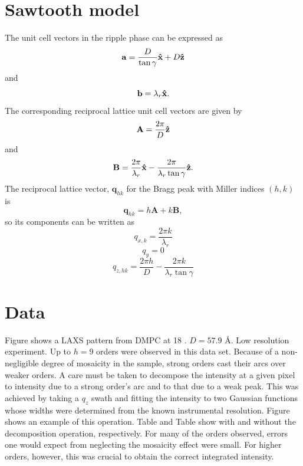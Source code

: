 \documentclass[12pt,letterpaper]{article}
\begin{document}
\section{Sawtooth model}
The unit cell vectors in the ripple phase can be expressed as 
\begin{equation}
  \mathbf{a} = \frac{D}{\tan\gamma}\mathbf{\hat{x}} + D\mathbf{\hat{z}}
\end{equation}
and
\begin{equation}
  \mathbf{b} = \lambda_r\mathbf{\hat{x}}.
\end{equation}
The corresponding reciprocal lattice unit cell vectors are given by
\begin{equation}
  \mathbf{A} = \frac{2\pi}{D}\mathbf{\hat{z}}
\end{equation}
and
\begin{equation}
  \mathbf{B} = \frac{2\pi}{\lambda_r}\mathbf{\hat{x}} - \frac{2\pi}{\lambda_r\tan\gamma}\mathbf{\hat{z}}.
\end{equation}
The reciprocal lattice vector, $\mathbf{q}_{hk}$ for the Bragg peak with 
Miller indices $(h,k)$ is 
\begin{equation}
  \mathbf{q}_{hk}=h\mathbf{A}+k\mathbf{B},
\end{equation}
so its components can be written as
\begin{equation}
  q_{x,k} = \frac{2\pi k}{\lambda_r}
\end{equation}
\begin{equation}
  q_y = 0
\end{equation}
\begin{equation}
  q_{z,hk} = \frac{2\pi h}{D} - \frac{2\pi k}{\lambda_r\tan\gamma}
\end{equation}


\section{Data}
Figure shows a LAXS pattern from DMPC at 18 \degC. $D=57.9$ \AA. Low
resolution experiment. Up to $h=9$ orders were observed in this
data set. Because of a non-negligible degree of mosaicity in the sample,
strong orders cast their arcs over weaker orders. A care must be 
taken to decompose the intensity at a given pixel to intensity due to
a strong order's arc and to that due to a weak peak. This was achieved
by taking a $q_z$ swath and fitting the intensity to two Gaussian
functions whose widths were determined from the known instrumental 
resolution. Figure shows an example of this operation. Table and
Table show with and without the decomposition operation, respectively. 
For many of the orders observed, errors one would expect from 
neglecting the mosaicity effect were small. For higher orders, however,
this was crucial to obtain the correct integrated intensity.
\end{document}
